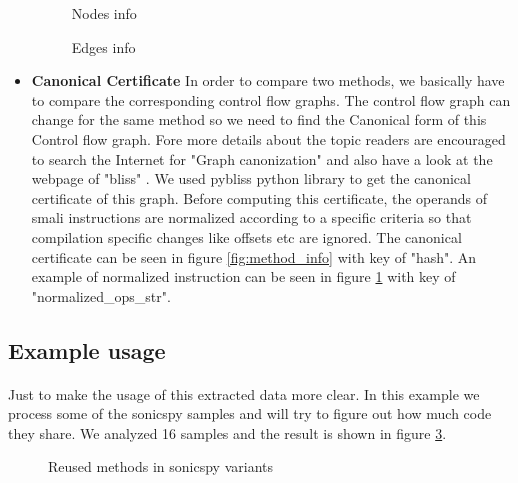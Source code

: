 \documentclass[../main.tex]{subfile}
\begin{document}
\begin{itemize}
			\begin{figure}[H]
				\centering
				\caption{Nodes info}
				\label{fig:nodes_info}	
			\end{figure}

			\begin{figure}[H]
				\centering
				\caption{Edges info}
				\label{fig:edges_info}	
			\end{figure}
		

			\item \textbf{Canonical Certificate} In order to compare two methods, we basically have to compare the corresponding control flow graphs. The control flow graph can change for the same method so  we need to find the Canonical form of this Control flow graph. Fore more details about the topic readers are encouraged to search the Internet for "Graph canonization" and also have a look at the webpage of "bliss" \cite{bliss}. We used pybliss python library \cite{bliss} \cite{junttila2007engineering} to get the canonical certificate of this graph. Before computing this certificate, the operands  of smali instructions are normalized according to a specific criteria so that compilation specific changes like offsets etc are ignored. The canonical certificate can be seen in figure \ref{fig:method_info} with key of "hash". An example of normalized instruction can be seen in figure \ref{fig:nodes_info} with key of "normalized\_ops\_str".
		\end{itemize}
		
		\subsection{Example usage}
		\paragraph{}Just to make the usage of this extracted data more clear. In this example we process some of the sonicspy samples and will try to figure out how much code they share. We analyzed 16 samples and the result is shown in figure \ref{fig:sonicspy_freq}.
		
		\begin{figure}[H]
			\centering
			\caption{Reused methods in sonicspy variants}
			\label{fig:sonicspy_freq}
		\end{figure}
\end{document}
